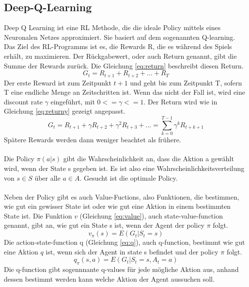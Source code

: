 \subsection{Deep-Q-Learning}
Deep Q Learning ist eine RL Methode, die die ideale Policy mittels eines Neuronalen Netzes approximiert. Sie basiert auf dem sogenannten Q-learning.
\\
Das Ziel des RL-Programms ist es, die Rewards R, die es während des Spiels erhält, zu maximieren. Der Rückgabewert, oder auch Return genannt, gibt die Summe der Rewards zurück. Die Gleichung \ref{eq:return} beschreibt diesen Return.
\begin{equation}\label{eq:return}
	G_t = R_{t+1}+R_{t+2}+...+R_T
\end{equation}
Der erste Reward ist zum Zeitpunkt $t+1$ und geht bis zum Zeitpunkt T, sofern T eine endliche Menge an Zeitschritten ist.
Wenn das nicht der Fall ist, wird eine discount rate $\gamma{}$ eingeführt, mit $0<=\gamma{}<=1$.
Der Return wird wie in Gleichung \ref{eq:returny} gezeigt angepasst.
\begin{equation}\label{eq:returny}
	G_t = R_{t+1}+\gamma{}R_{t+2}+\gamma{}^2R_{t+3}+... = \sum_{k=0}^{T-1} \gamma{}^kR_{t+k+1}
\end{equation}
Spätere Rewards werden dann weniger beachtet als frühere.
\\\\
Die Policy $\pi{}(a|s)$ gibt die Wahrscheinlichkeit an, dass die Aktion a gewählt wird, wenn der State s gegeben ist. Es ist also eine Wahrscheinlichkeitsverteilung von $s \in S$ über alle $a \in A$. Gesucht ist die optimale Policy.
\\\\
Neben der Policy gibt es auch Value-Fuctions, also Funktionen, die bestimmen, wie gut ein gewisser State ist oder wie gut eine Aktion in einem bestimmten State ist.
Die Funktion $v$ (Gleichung \ref{eq:value}), auch state-value-function genannt, gibt an, wie gut ein State s ist, wenn der Agent der policy $\pi$ folgt. 
\begin{equation}\label{eq:value}
	v_\pi(s) = E(G_t|S_t=s)
\end{equation}
Die action-state-function q (Gleichung \ref{eq:q}), auch q-function, bestimmt wie gut eine Aktion $q$ ist, wenn sich der Agent in state s befindet und der policy $\pi$ folgt.
\begin{equation}\label{eq:q}
	q_\pi(s,a) = E(G_t|S_t=s, A_t=a)
\end{equation}
Die q-function gibt sogennnante q-values für jede mögliche Aktion aus, anhand dessen bestimmt werden kann welche Aktion der Agent aussuchen soll. 
